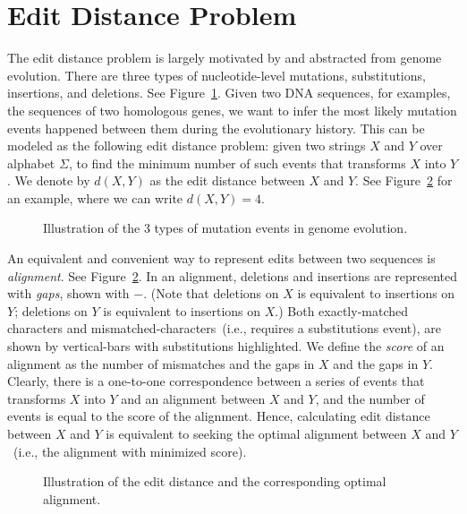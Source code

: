 \section{Edit Distance Problem}

The edit distance problem is largely motivated by and abstracted from genome evolution.
There are three types of nucleotide-level mutations, substitutions, insertions, and deletions.
See Figure~\ref{fig:edits}. Given two DNA sequences, for examples, the sequences of two homologous genes,
we want to infer the most likely mutation events happened between them during the evolutionary history.
This can be modeled as the following edit distance problem: given two strings $X$ and $Y$ over alphabet $\Sigma$,
to find the minimum number of such events that transforms $X$ into $Y$.
We denote by $d(X, Y)$ as the edit distance between $X$ and $Y$.
See Figure~\ref{fig:align} for an example, where we can write $d(X, Y) = 4$.

\begin{figure}[h]
\centering{}
\caption{Illustration of the 3 types of mutation events in genome evolution.}
\label{fig:edits}
\end{figure}

An equivalent and convenient way to represent edits between two sequences 
is \emph{alignment}. See Figure~\ref{fig:align}.
In an alignment, deletions and insertions are represented with \emph{gaps}, shown with $-$.
(Note that deletions on $X$ is equivalent to insertions on $Y$;
deletions on $Y$ is equivalent to insertions on $X$.)
Both exactly-matched characters and mismatched-characters~(i.e., requires a substitutions event),
are shown by vertical-bars with substitutions highlighted.
We define the \emph{score} of an alignment as the number of mismatches
and the gaps in $X$ and the gaps in $Y$.
Clearly, there is a one-to-one correspondence between a series
of events that transforms $X$ into $Y$ and an alignment between $X$ and $Y$,
and the number of events is equal to the score of the alignment. %
Hence, calculating edit distance between $X$ and $Y$ is equivalent to
seeking the optimal alignment between $X$ and $Y$~(i.e., the alignment with minimized score).

\begin{figure}[h]
\centering{}
\caption{Illustration of the edit distance and the corresponding optimal alignment.}
\label{fig:align}
\end{figure}


